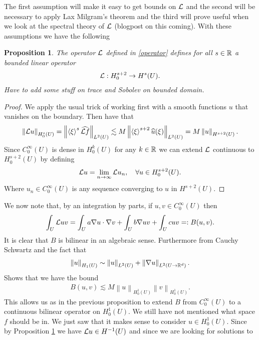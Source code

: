 \documentclass[12pt]{article}
\newtheorem{proposition}{Proposition}
\newcommand{\red}[1]{{\color{red}#1}}
\newcommand{\br}[1]{\left\langle#1\right\rangle} \newcommand{\set}[1]{\left\{#1\right\}} \newcommand{\qp}[1]{\left(#1\right)}\newcommand{\qb}[1]{\left[#1\right]}
\renewcommand{\norm}[1]{\left\lVert #1 \right\rVert}\renewcommand{\abs}[1]{\left| #1 \right|}
\begin{document}
The first assumption will make it easy to get bounds on $\mathcal{L}$ and the second will be necessary to apply Lax Milgram's theorem and the third will prove useful when we look at the spectral theory of $\mathcal{L}$ (blogpost on this coming). With these assumptions we have the following
\begin{proposition}\label{domain L}
	The operator $\mathcal{L}$ defined in \eqref{operator} defines for all $s \in \mathbb{R}$ a bounded linear operator
	\begin{align*}
		\mathcal{L} : H_0^{s+2}\to H^s (U).
	\end{align*}
	\red{Have to add some stuff on trace and Sobolev on bounded domain.}
\end{proposition}
\begin{proof}
	We apply the usual trick of working first with a smooth functions $u$ that vanishes on the boundary. Then have that
	\begin{align*}
		\norm{\Ll u}_{H^s_0(U)}=\norm{\br{\xi }^s \wh{\Ll f}}_{L^2(U)}\lesssim  M \norm{\br{\xi }^{s+2}\wh{u}(\xi )}_{L^2(U)} =M \norm{u}_{H^{s+2}(U)} .
	\end{align*}
	Since $C_0^\infty(U)$ is dense in $H^k_0(U)$ for any $k \in \mathbb{R}$ we can extend $\mathcal{L}$ continuous to $H_0^{s+2}(U)$ by defining
	\begin{align*}
		\mathcal{L} u = \lim_{n \to \infty}\mathcal{L} u_n , \quad\forall u \in  H_0^{s+2}(U).
	\end{align*}
	Where $u_n \in C_0^\infty(U)$ is any sequence converging to $u$ in  $H^{s+2}(U)$.
\end{proof}
We now note that, by an integration by parts, if $u,v \in  C_0^\infty(U)$ then \begin{align*}
	\int_{U} \mathcal{L} u v =\int_{U}a \nabla u \cdot \nabla v + \int_{U} b \nabla  u v + \int_{U} cuv=: B(u,v)   .
\end{align*}
It is clear that $B$ is bilinear in an algebraic sense. Furthermore from Cauchy Schwartz and  the fact that
\begin{align*}
	\norm{u}_{H_1(U)}\sim \norm{u}_{L^2(U)}+\norm{\nabla u}_{L^2(U\to \R^d)}.
\end{align*}
Shows that we have the bound
\begin{align}\label{cont B}
	B(u,v)\lesssim M \norm{u}_{H_0^1(U)}\norm{v}_{H_0^1(U)}.
\end{align}
This allows us as in the previous proposition to extend $B$ from $C_0^\infty(U)$ to a continuous bilinear operator on  $H^1_0(U)$. We still have not mentioned what space $f$ should be in. We just saw that it makes sense to consider $u \in  H_0^1(U)$. Since by Proposition \ref{domain L} we have $\mathcal{L} u \in H^{-1}(U)$ and since we are looking for solutions to
\end{document}
